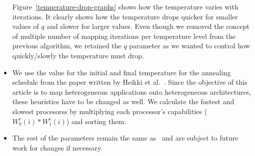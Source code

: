 \begin{itemize}
Figure~\ref{temperature-drop-graphs} shows how the temperature varies with
iterations. It clearly shows how the temperature drops quicker for smaller
values of $q$ and slower for larger values. Even though we removed the concept
of multiple number of mapping iterations per temperature level from the previous
algorithm, we retained the $q$ parameter as we wanted to control how
quickly/slowly the temperature must drop.

\item We use the value for the initial and final temperature for the annealing
schedule from the paper written by Heikki et al.~\cite{hors06}. Since the
objective of this article is to map heterogeneous applications onto
heterogeneous architectures, these heuristics have to be changed as well. We 
calculate the fastest and slowest procesorss by multiplying each processor's
capabilities ($W^r_0(i) * W^r_1(i)$) and sorting them. 

\item The rest of the parameters remain the same as~\cite{hors06} and are subject to future work
for changes if necessary.

\end{itemize} 

